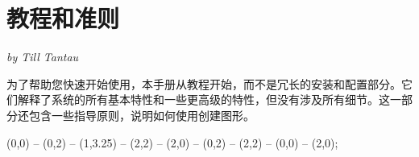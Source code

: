 

\part{教程和准则}

{\Large \emph{by Till Tantau}}

\bigskip


为了帮助您快速开始使用\tikzname ，本手册从教程开始，而不是冗长的安装和配置部分。它们解释了系统的所有基本特性和一些更高级的特性，但没有涉及所有细节。这一部分还包含一些指导原则，说明如何使用\tikzname 创建图形。

\vskip3cm

\begin{codeexample}[graphic=white,width=0pt]
\tikz \draw[thick,rounded corners=8pt]
  (0,0) -- (0,2) -- (1,3.25) -- (2,2) -- (2,0) -- (0,2) -- (2,2) -- (0,0) -- (2,0);
\end{codeexample}










\clearpage